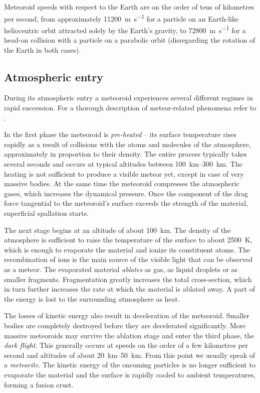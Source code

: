     Meteoroid speeds with respect to the Earth are on the order of tens of kilometres per second,
    from approximately \SI{11200}{\metre\per\second} for a particle on an Earth-like
    heliocentric orbit attracted solely by the Earth's gravity, to \SI{72800}{\metre\per\second}
    for a head-on collision with a particle on a parabolic orbit (disregarding the rotation of the Earth in both cases).

    \subsection{Atmospheric entry} \label{ile}
        During its atmospheric entry a meteoroid experiences several different regimes in rapid succession.
        For a thorough description of meteor-related phenomena refer to \citep{ceplecha+1998}.

        In the first phase the meteoroid is \emph{pre-heated} -- its surface temperature rises rapidly
        as a result of collisions with the atoms and molecules of the atmosphere,
        approximately in proportion to their density.
        The entire process typically takes several seconds and occurs at typical altitudes
        between \SIrange{100}{300}{\kilo\metre}. The heating is not sufficient to produce a visible meteor yet,
        except in case of very massive bodies. At the same time the meteoroid compresses
        the atmospheric gases, which increases the dynamical pressure. Once the component of the drag force
        tangential to the meteoroid's surface exceeds the strength of the material,
        superficial spallation starts.

        The next stage begins at an altitude of about \SI{100}{\kilo\metre}.
        The density of the atmosphere is sufficient to raise the temperature of the surface
        to about \SI{2500}{\kelvin}, which is enough to evaporate the material and ionize its constituent atoms.
        The recombination of ions is the main source of the visible light that can be observed as a meteor.
        The evaporated material \emph{ablates} as gas, as liquid droplets or as smaller fragments.
        Fragmentation greatly increases the total cross-section, which in turn
        further increases the rate at which the material is ablated away.
        A part of the energy is lost to the surrounding atmosphere as heat.

        The losses of kinetic energy also result in deceleration of the meteoroid.
        Smaller bodies are completely destroyed before they are decelerated significantly.
        More massive meteoroids may survive the ablation stage and enter the third phase, the \emph{dark flight}.
        This generally occurs at speeds on the order of a few kilometres per second and altitudes of about \SIrange{20}{50}{\kilo\metre}.
        From this point we usually speak of a \emph{meteorite}.
        The kinetic energy of the oncoming particles is no longer sufficient to evaporate the material
        and the surface is rapidly cooled to ambient temperatures, forming a fusion crust.

